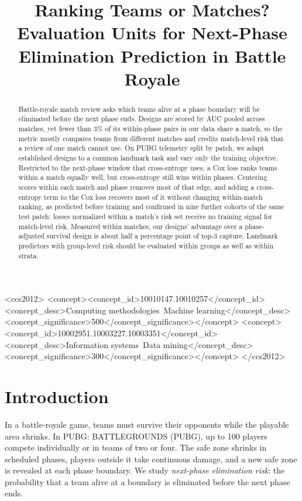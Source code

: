 \documentclass[sigconf,anonymous,nonacm]{acmart}
\begin{document}
\title[Evaluation Units for Next-Phase Elimination Prediction]{Ranking Teams or Matches? Evaluation Units for Next-Phase Elimination Prediction in Battle Royale}
\begin{abstract}
Battle-royale match review asks which teams alive at a phase boundary will be eliminated before the next phase ends. Designs are scored by AUC pooled across matches, yet fewer than 3\% of its within-phase pairs in our data share a match, so the metric mostly compares teams from different matches and credits match-level risk that a review of one match cannot use. On PUBG telemetry split by patch, we adapt established designs to a common landmark task and vary only the training objective. Restricted to the next-phase window that cross-entropy uses, a Cox loss ranks teams within a match equally well, but cross-entropy still wins within phases. Centering scores within each match and phase removes most of that edge, and adding a cross-entropy term to the Cox loss recovers most of it without changing within-match ranking, as predicted before training and confirmed in nine further cohorts of the same test patch: losses normalized within a match's risk set receive no training signal for match-level risk. Measured within matches, our designs' advantage over a phase-adjusted survival design is about half a percentage point of top-3 capture. Landmark predictors with group-level risk should be evaluated within groups as well as within strata.
\end{abstract}
\begin{CCSXML}
<ccs2012>
<concept><concept_id>10010147.10010257</concept_id><concept_desc>Computing methodologies~Machine learning</concept_desc><concept_significance>500</concept_significance></concept>
<concept><concept_id>10002951.10003227.10003351</concept_id><concept_desc>Information systems~Data mining</concept_desc><concept_significance>300</concept_significance></concept>
</ccs2012>
\end{CCSXML}
\maketitle
\section{Introduction}
\label{sec:introduction}
In a battle-royale game, teams must survive their opponents while the playable area shrinks. In PUBG: BATTLEGROUNDS (PUBG), up to 100 players compete individually or in teams of two or four. The safe zone shrinks in scheduled phases, players outside it take continuous damage, and a new safe zone is revealed at each phase boundary. We study \emph{next-phase elimination risk}: the probability that a team alive at a boundary is eliminated before the next phase ends.
\end{document}
